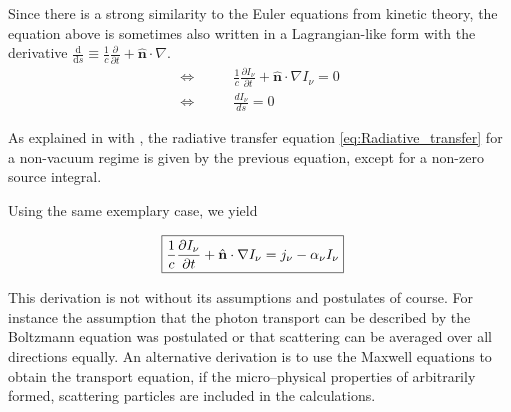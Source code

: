 Since there is a strong similarity to the Euler equations from kinetic theory, the equation above is sometimes also written in a Lagrangian-like form with the derivative $\frac{\mathrm{d}}{\mathrm{d}s} \equiv \frac{1}{c}\frac{\partial}{\partial t} + \hat{\textbf{n}}\cdot\nabla$.
\begin{align*}
 \Longleftrightarrow\qquad
 &\frac{1}{c}\frac{\partial I_{\nu}}{\partial t} + \hat{\textbf{n}}\cdot\nabla I_{\nu} = 0 \\
 \Longleftrightarrow\qquad
 &\frac{dI_{\nu}}{ds} = 0
\end{align*}

As explained in  with , the radiative transfer equation \eqref{eq:Radiative_transfer} for a non-vacuum regime is given by the previous equation, except for a non-zero source integral.

Using the same exemplary case, we yield

\begin{align*}
 \Aboxed{\frac{1}{c}\frac{\partial I_{\nu}}{\partial t} + \hat{\textbf{n}}\cdot\nabla I_{\nu} = j_{\nu} - \alpha_{\nu}I_{\nu}}
\end{align*}

This derivation is not without its assumptions and postulates of course.
For instance the assumption that the photon transport can be described by the Boltzmann equation was postulated or that scattering can be averaged over all directions equally.
An alternative derivation is to use the Maxwell equations to obtain the transport equation, if the micro--physical properties of arbitrarily formed, scattering particles are included in the calculations.

